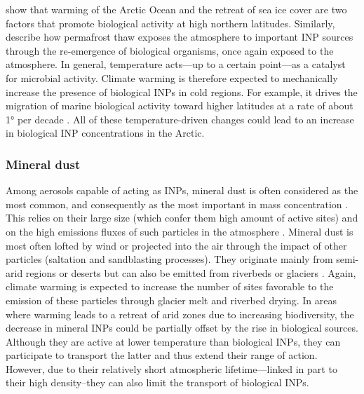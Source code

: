     \citet{creamean_ice_2019} show that warming of the Arctic Ocean and the retreat of sea ice cover are two factors that promote biological activity at high northern latitudes. Similarly, \citet{creamean_thawing_2020} describe how permafrost thaw exposes the atmosphere to important INP sources through the re-emergence of biological organisms, once again exposed to the atmosphere. In general, temperature acts—up to a certain point—as a catalyst for microbial activity. Climate warming is therefore expected to mechanically increase the presence of biological INPs in cold regions. For example, it drives the migration of marine biological activity toward higher latitudes at a rate of about 1° per decade \citep{renaut_northward_2018}. All of these temperature-driven changes could lead to an increase in biological INP concentrations in the Arctic.
    
    \subsubsection{Mineral dust}
    Among aerosols capable of acting as INPs, mineral dust is often considered as the most common, and consequently as the most important in mass concentration \citep{kok_contribution_2021}. This relies on their large size (which confer them high amount of active sites) and on the high emissions fluxes of such particles in the atmosphere \citep{kok_mineral_2023}.    
    Mineral dust is most often lofted by wind or projected into the air through the impact of other particles (saltation and sandblasting processes). They originate mainly from semi-arid regions or deserts but can also be emitted from riverbeds or glaciers \citep{meinander_newly_2022}. 
    Again, climate warming is expected to increase the number of sites favorable to the emission of these particles through glacier melt and riverbed drying. In areas where warming leads to a retreat of arid zones due to increasing biodiversity, the decrease in mineral INPs could be partially offset by the rise in biological sources.
 Although they are active at lower temperature than biological INPs, they can participate to transport the latter and thus extend their range of action. However, due to their relatively short atmospheric lifetime—linked in part to their high density\---they can also limit the transport of biological INPs.


